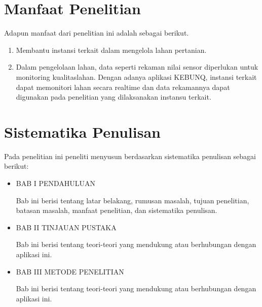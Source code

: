 \begin{flushleft}
\section{Manfaat Penelitian}

\begin{justify}
  Adapun manfaat dari penelitian ini adalah sebagai berikut.


\end{justify}
\begin{enumerate}
  \item Membantu instansi terkait dalam mengelola lahan pertanian.
  \item Dalam pengelolaan lahan, data seperti rekaman nilai sensor diperlukan untuk monitoring kualitaslahan. Dengan adanya aplikasi KEBUNQ, instansi terkait dapat memonitori lahan secara realtime dan data rekamannya dapat digunakan pada penelitian yang dilaksanakan instansu terkait.

  \end{enumerate}
\vspace{2cm}



\section{Sistematika Penulisan}
Pada penelitian ini peneliti menyusun berdasarkan sistematika penulisan sebagai berikut: \\
\begin{itemize}
  \item \noindent BAB I PENDAHULUAN
  \begin{justify}
  Bab ini berisi tentang latar belakang, rumusan masalah, tujuan penelitian, 
  batasan masalah, manfaat penelitian, dan sistematika penulisan.
  \end{justify}
\end{itemize}

\begin{itemize}
  \item \noindent BAB II TINJAUAN PUSTAKA
  \begin{justify}
    Bab ini berisi tentang teori-teori yang mendukung atau berhubungan dengan aplikasi ini.

  \end{justify}
\end{itemize}

\begin{itemize}
  \item \noindent BAB III METODE PENELITIAN
  \begin{justify}
    Bab ini berisi tentang teori-teori yang mendukung atau berhubungan dengan aplikasi ini.


\end{justify}
\end{itemize}
\end{flushleft}
